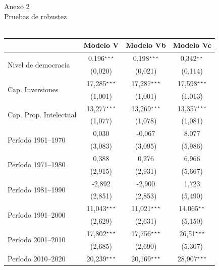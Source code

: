 \documentclass[a4paper]{tufte-handout}
\begin{document}
\begin{table}[h!]
  \centering
  \selectfont
   \smallskip\noindent\small Anexo 2 \\ Pruebas de robustez \\~\\
  \begin{tabular}{l c c c}
    \toprule
     & Modelo V & Modelo Vb & Modelo Vc \\ \midrule
    \multirow{2}{*}{Nivel de democracia} & 0,196$^{\star\star\star}$ & 0,198$^{\star\star\star}$ & 0,342$^{\star\star}$ \\
    & {\scriptsize (0,020)} & {\scriptsize (0,021)} & {\scriptsize (0,114)} \\ 
    \multirow{2}{*}{Cap. Inversiones} & 17,285$^{\star\star\star}$ & 17,287$^{\star\star\star}$ & 17,598$^{\star\star\star}$ \\
    & {\scriptsize (1,001)} & {\scriptsize (1,001)} & {\scriptsize (1,013)} \\
    \multirow{2}{*}{Cap. Prop. Intelectual} & 13,277$^{\star\star\star}$ & 13,269$^{\star\star\star}$ & 13,357$^{\star\star\star}$ \\
    & {\scriptsize (1,077)} & {\scriptsize (1,078)} & {\scriptsize (1,081)}\\
    \multirow{2}{*}{Período 1961--1970} & 0,030 & -0,067 & 8,077 \\
    & {\scriptsize (3,083)} & {\scriptsize (3,095)} & {\scriptsize (5,986)} \\
    \multirow{2}{*}{Período 1971--1980} & 0,388 & 0,276 & 6,966 \\
    & {\scriptsize (2,915)} & {\scriptsize (2,931)} & {\scriptsize (5,667)} \\
    \multirow{2}{*}{Período  1981--1990} & -2,892 & -2,900 & 1,723 \\
    & {\scriptsize (2,851)} & {\scriptsize (2,853)} & {\scriptsize (5,490)} \\
    \multirow{2}{*}{Período 1991--2000} & 11,043$^{\star\star\star}$ & 11,021$^{\star\star\star}$  & 14,065$^{\star\star}$ \\
    & {\scriptsize (2,629)} & {\scriptsize (2,631)} & {\scriptsize (5,150)} \\ 
    \multirow{2}{*}{Período  2001--2010} & 17,802$^{\star\star\star}$ & 17,756$^{\star\star\star}$ & 26,51$^{\star\star\star}$ \\
    & {\scriptsize (2,685)} & {\scriptsize (2,690)} & {\scriptsize (5,307)} \\ 
    \multirow{2}{*}{Período 2010--2020} & 20,239$^{\star\star\star}$ & 20,169$^{\star\star\star}$ & 28,907$^{\star\star\star}$ \\

\end{tabular}
\end{table}
\end{document}
